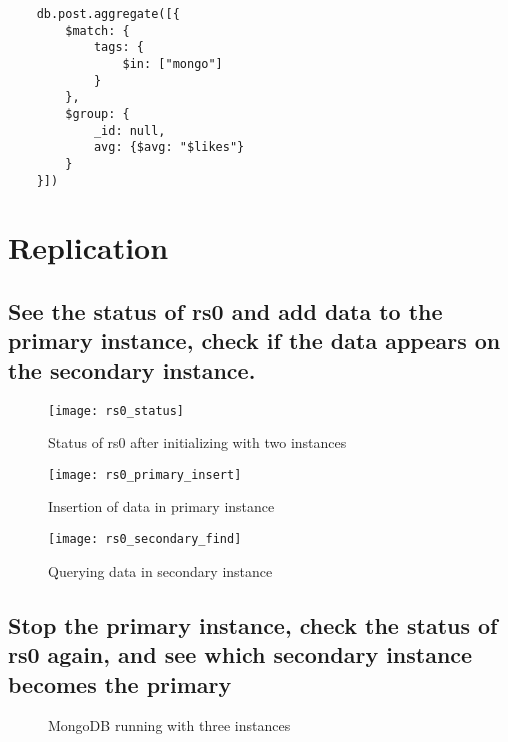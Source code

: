 \begin{lstlisting}
    db.post.aggregate([{
        $match: {
            tags: {
                $in: ["mongo"]
            }
        },
        $group: {
            _id: null,
            avg: {$avg: "$likes"}
        }
    }])
\end{lstlisting}

\clearpage

\section{Replication}

\subsection{See the status of rs0 and add data to the primary instance, check if the data appears on the secondary instance.}

\begin{figure}[!h]
    \begin{center}
        \texttt{[image: rs0\_status]}
        \caption{Status of rs0 after initializing with two instances}
    \end{center}
\end{figure}

\begin{figure}[!h]
    \begin{center}
        \texttt{[image: rs0\_primary\_insert]}
        \caption{Insertion of data in primary instance}
    \end{center}
\end{figure}

\begin{figure}[!h]
    \begin{center}
        \texttt{[image: rs0\_secondary\_find]}
        \caption{Querying data in secondary instance}
    \end{center}
\end{figure}

\subsection{Stop the primary instance, check the status of rs0 again, and see which secondary instance becomes the primary}

\begin{figure}[!h]
    \begin{center}
        \caption{MongoDB running with three instances}
    \end{center}
\end{figure}

